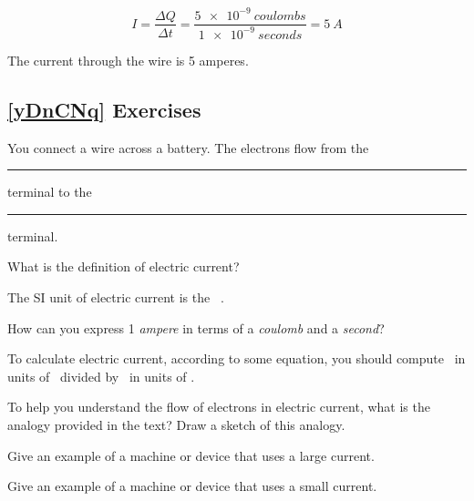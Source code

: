 \documentclass[dvipsnames]{article}
\numberwithin{equation}{section}
\numberwithin{figure}{section}
\begin{document}
\begin{equation*}
    I = \frac{\Delta{Q}}{\Delta{t}} = \frac{\qty{5e-9}{coulombs}}{\qty{1e-9}{seconds}} = \qty{5}{A}
\end{equation*}

The current through the wire is 5 amperes.

\vspace{1em}

\cyanhrule


\clearpage
\subsection*{\ref{yDnCNq} Exercises}

\begin{exercise}
    You connect a wire across a battery. The electrons flow from the \rule{2cm}{0.15mm} terminal to the \rule{2cm}{0.15mm} terminal.
\end{exercise}

\begin{exercise}
    What is the definition of electric current?
\end{exercise}

\begin{exercise}
    The SI unit of electric current is the \myfillin\ .
\end{exercise}

\begin{exercise}
    How can you express 1 \textit{ampere} in terms of a \textit{coulomb} and a \textit{second}?
\end{exercise}

\begin{exercise}
    To calculate electric current, according to some equation, you should compute \myfillin\ in units of \myfillin\ divided by \myfillin\ in units of \myfillin .
\end{exercise}

\begin{exercise}
    To help you understand the flow of electrons in electric current, what is the analogy provided in the text? Draw a sketch of this analogy.
\end{exercise}

\begin{exercise}
    Give an example of a machine or device that uses a large current.
\end{exercise}

\begin{exercise}
    Give an example of a machine or device that uses a small current.
\end{exercise}
\end{document}
